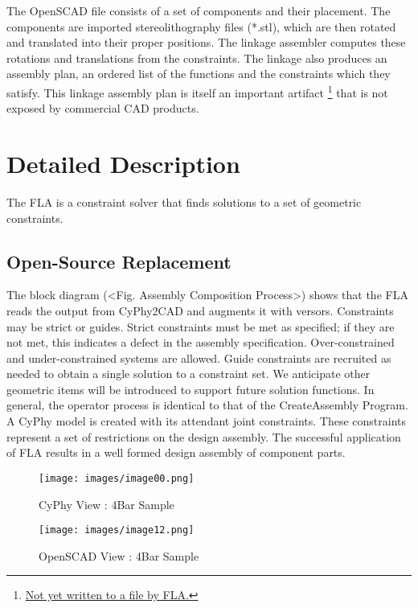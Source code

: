 \documentclass[]{report}
\begin{document}
The OpenSCAD file consists of a set of components and their placement. 
The components are imported stereolithography files (*.stl), 
which are then rotated and translated into their proper positions. 
The linkage assembler computes these rotations and translations from the constraints. 
The linkage also produces an assembly plan, an ordered list of 
the functions and the constraints which they satisfy. 
This linkage assembly plan is itself an important artifact
\footnote{\url{Not yet written to a file by FLA.}} 
that is not exposed by commercial CAD products.

\section{Detailed Description}

The FLA is a constraint solver that finds solutions to a set of geometric constraints.

\subsection{Open-Source Replacement}

The block diagram (<Fig. Assembly Composition Process>) shows that 
the FLA reads the output from CyPhy2CAD and augments it with versors. 
Constraints may be strict or guides. Strict constraints must be met as specified; 
if they are not met, this indicates a defect in the assembly specification. 
Over-constrained and under-constrained systems are allowed. 
Guide constraints are recruited as needed to obtain a single 
solution to a constraint set. We anticipate other geometric 
items will be introduced to support future solution functions. 
In general, the operator process is identical to that of the CreateAssembly Program. 
A CyPhy model is created with its attendant joint constraints. 
These constraints represent a set of restrictions on the design assembly. 
The successful application of FLA results in a well formed design assembly of component parts. 

\begin{figure}[ht!]
	\centering
	\texttt{[image: images/image00.png]}
	\caption{CyPhy View : 4Bar Sample}
	\label{fig:4bar-cyphy}
\end{figure}


\begin{figure}[ht!]
	\centering
	\texttt{[image: images/image12.png]}
	\caption{OpenSCAD View : 4Bar Sample}
	\label{fig:4bar-openscad}
\end{figure}
\end{document}
